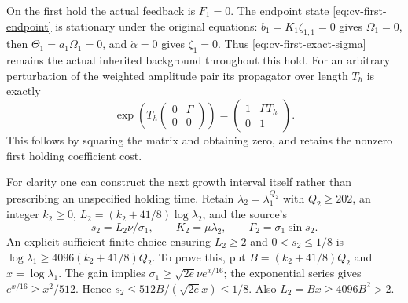 On the first hold the actual feedback is $F_1=0$.
The endpoint state \eqref{eq:cv-first-endpoint} is stationary under
the original equations: $b_1=K_1\zeta_{1,1}=0$ gives
$\dot\Omega_1=0$, then $\dot\Theta_1=a_1\Omega_1=0$,
and $\dot\alpha=0$ gives $\dot\zeta_1=0$.
Thus \eqref{eq:cv-first-exact-sigma} remains the actual inherited
background throughout this hold. For an arbitrary perturbation of
the weighted amplitude pair its propagator over length $T_h$ is
exactly
\begin{equation}
 \exp\!\left(T_h\begin{pmatrix}0&\Gamma\\0&0\end{pmatrix}\right)
 =\begin{pmatrix}1&\Gamma T_h\\0&1\end{pmatrix}.
 \label{eq:cv-first-hold-propagator}
\end{equation}
This follows by squaring the matrix and obtaining zero, and retains
the nonzero first holding coefficient cost.

For clarity one can construct the next growth interval itself rather
than prescribing an unspecified holding time. Retain
$\lambda_2=\lambda_1^{Q_2}$ with $Q_2\geq202$, an integer $k_2\geq0$,
$L_2=(k_2+41/8)\log\lambda_2$, and the source's
\[
 s_2=L_2\nu/\sigma_1,\qquad K_2=\mu\lambda_2,
 \qquad\Gamma_2=\sigma_1\sin s_2.
\]
An explicit sufficient finite choice ensuring $L_2\geq2$ and
$0<s_2\leq1/8$ is
$\log\lambda_1\geq4096(k_2+41/8)Q_2$.
To prove this, put $B=(k_2+41/8)Q_2$ and $x=\log\lambda_1$.
The gain implies $\sigma_1\geq\sqrt{2e}\nu e^{x/16}$;
the exponential series gives $e^{x/16}\geq x^2/512$.
Hence $s_2\leq512B/(\sqrt{2e}x)\leq1/8$.
Also $L_2=Bx\geq4096B^2>2$.


